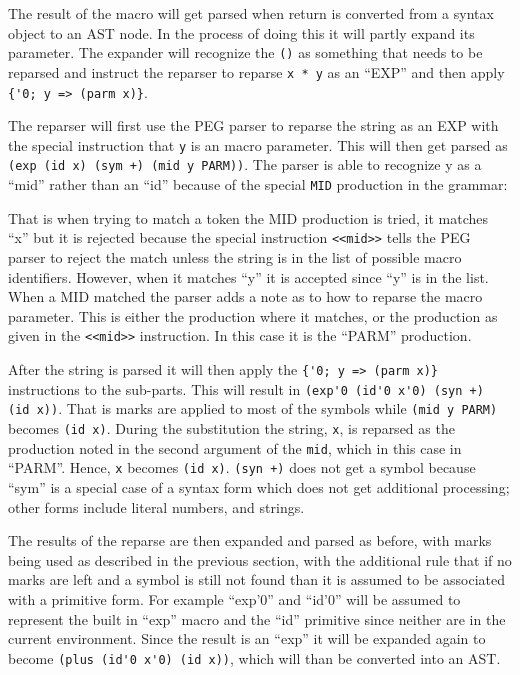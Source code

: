\documentclass[12pt,english,letterpaper]{article}
\begin{document}
The result of the macro will get parsed when return is converted from a
syntax object to an AST node.  In the process of doing this it will
partly expand its parameter.  The expander will recognize the \verb/()/
as something that needs to be reparsed and instruct the reparser to reparse
\verb/x * y/ as an ``EXP'' and then apply \verb/{'0; y => (parm x)}/.

The reparser will first use the PEG parser to reparse the string 
as an EXP with the special instruction that \verb/y/ is
an macro parameter.  This will then get parsed as
\verb/(exp (id x) (sym +) (mid y PARM))/.  The parser is able to recognize y
as a ``mid'' rather than an ``id'' because of the special \verb/MID/
production in the grammar:


That is when trying to match a token the MID production is tried, it
matches ``x'' but it is rejected because the special instruction
\verb/<<mid>>/ tells the PEG parser to reject the match unless the
string is in the list of possible macro identifiers.  However, when it
matches ``y'' it is accepted since ``y'' is in the list.  When a MID
matched the parser adds a note as to how to reparse the macro
parameter.  This is either the production where it matches, or the
production as given in the \verb/<<mid>>/ instruction.  In this case
it is the ``PARM'' production.

After the string is parsed it will then apply the
\verb/{'0; y => (parm x)}/ instructions to the sub-parts.  This will
result in \verb/(exp'0 (id'0 x'0) (syn +) (id x))/.  That is marks are
applied to most of the symbols while \verb/(mid y PARM)/ becomes
\verb/(id x)/.  During the substitution the string, \verb/x/, is
reparsed as the production noted in the second argument of the
\verb/mid/, which in this case in ``PARM''.  Hence, \verb/x/ becomes
\verb/(id x)/.  \verb/(syn +)/ does not get a symbol because ``sym''
is a special case of a syntax form which does not get additional
processing; other forms include literal numbers, and strings.

The results of the reparse are then expanded and parsed as before,
with marks being used as described in the previous section, with the
additional rule that if no marks are left and a symbol is still not
found than it is assumed to be associated with a primitive form.  For
example ``exp'0'' and ``id'0'' will be assumed to represent the built
in ``exp'' macro and the ``id'' primitive since neither are in the
current environment.  Since the result is an ``exp'' it will be
expanded again to become \verb/(plus (id'0 x'0) (id x))/, 
which will than be converted into an AST.
\end{document}

